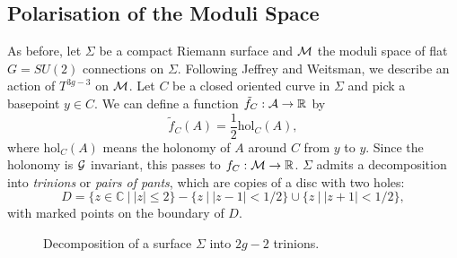 \subsection{Polarisation of the Moduli Space}	
	As before, let $\Sigma$ be a compact Riemann surface and $\mathcal{M}$ the moduli space of flat $G=SU(2)$ connections on $\Sigma$. Following Jeffrey and Weitsman, we describe an action of $T^{3g-3}$ on $\mathcal{M}$. Let $C$ be a closed oriented curve in $\Sigma$ and pick a basepoint $y\in C$. We can define a function $\tilde{f}_C:\mathcal{A} \to \mathbb{R}$ by 
	\begin{equation}
		\tilde{f}_C(A) = \frac{1}{2}\text{hol}_C(A),
	\end{equation}
	where hol$_C(A)$ means the holonomy of $A$ around $C$ from $y$ to $y$. Since the holonomy is $\mathcal{G}$ invariant, this passes to $f_C:\mathcal{M} \to \mathbb{R}$. $\Sigma$ admits a decomposition into \textit{trinions} or \textit{pairs of pants}, which are copies of a disc with two holes:
	\begin{equation}
		D = \{z \in \mathbb{C}~|~ |z|\leq 2 \} - \{z~|~|z-1|<1/2\}\cup \{z~|~ |z+1| < 1/2\},
	\end{equation}
	with marked points on the boundary of $D$. 

	\begin{figure}[h]
		\centering
		\caption{Decomposition of a surface $\Sigma$ into $2g-2$ trinions. }
		\label{fig:torusdecomp}
	\end{figure}

